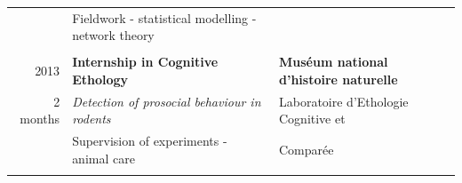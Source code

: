 \documentclass[11pt, oneside]{article}   	%
\begin{document}
\begin{tabular}{rll}
& Fieldwork - statistical modelling - network theory & \\
\\
2013 & \textbf{Internship in Cognitive Ethology} &  \textbf{Mus\'eum national d'histoire naturelle} \\
2 months & \textit{Detection of prosocial behaviour in rodents} & Laboratoire d'Ethologie Cognitive et \\
& Supervision of experiments - animal care & Compar\'ee \\
\\
\end{tabular}
\end{document}
